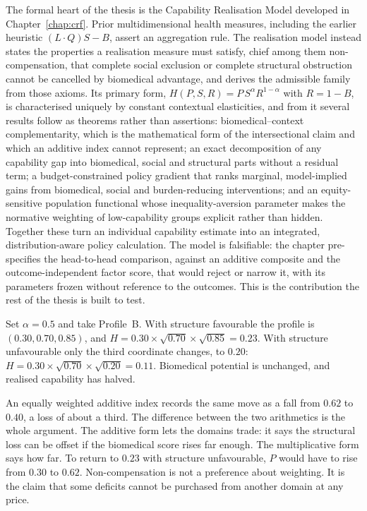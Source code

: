 The formal heart of the thesis is the Capability Realisation Model developed in Chapter~\ref{chap:crf}. Prior multidimensional health measures, including the earlier heuristic $(L\cdot Q)S-B$, assert an aggregation rule. The realisation model instead states the properties a realisation measure must satisfy, chief among them non-compensation, that complete social exclusion or complete structural obstruction cannot be cancelled by biomedical advantage, and derives the admissible family from those axioms. Its primary form, $H(P,S,R)=P\,S^{\alpha}R^{1-\alpha}$ with $R=1-B$, is characterised uniquely by constant contextual elasticities, and from it several results follow as theorems rather than assertions: biomedical--context complementarity, which is the mathematical form of the intersectional claim and which an additive index cannot represent; an exact decomposition of any capability gap into biomedical, social and structural parts without a residual term; a budget-constrained policy gradient that ranks marginal, model-implied gains from biomedical, social and burden-reducing interventions; and an equity-sensitive population functional whose inequality-aversion \citep{atkinson_1970} parameter makes the normative weighting of low-capability groups explicit rather than hidden. Together these turn an individual capability estimate into an integrated, distribution-aware policy calculation. The model is falsifiable: the chapter pre-specifies the head-to-head comparison, against an additive composite and the outcome-independent factor score, that would reject or narrow it, with its parameters frozen without reference to the outcomes. This is the contribution the rest of the thesis is built to test.

\begin{reading}
Set $\alpha=0.5$ and take Profile~B. With structure favourable the profile is
$(0.30,0.70,0.85)$, and
$H=0.30\times\sqrt{0.70}\times\sqrt{0.85}=0.23$. With structure unfavourable
only the third coordinate changes, to $0.20$:
$H=0.30\times\sqrt{0.70}\times\sqrt{0.20}=0.11$. Biomedical potential is
unchanged, and realised capability has halved.

An equally weighted additive index records the same move as a fall from $0.62$
to $0.40$, a loss of about a third. The difference between the two arithmetics
is the whole argument. The additive form lets the domains trade: it says the
structural loss can be offset if the biomedical score rises far enough. The
multiplicative form says how far. To return to $0.23$ with structure
unfavourable, $P$ would have to rise from $0.30$ to $0.62$.
Non-compensation is not a preference about weighting. It is the claim that some
deficits cannot be purchased from another domain at any price.
\end{reading}

